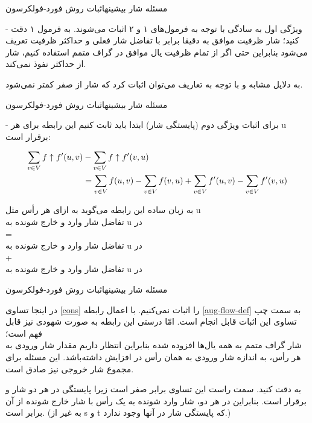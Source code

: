 \begin{itemframe}{مسئله شار بیشینه}{اثبات روش فورد-فولکرسون}
\item[-]
ویژگی اول به سادگی با توجه به فرمول‌های ۱ و ۲ اثبات می‌شوند. به فرمول ۱ دقت کنید‍؛ شار ظرفیت موافق به دقیقا برابر با تفاضل شار فعلی و حداکثر ظرفیت تعریف می‌شود بنابراین حتی اگر از تمام ظرفیت یال موافق در گراف متمم استفاده کنیم، شار
از حداکثر نفوذ نمی‌کند.
\item
به دلایل مشابه و با توجه به تعاریف می‌توان اثبات کرد که شار
از صفر کمتر نمی‌شود.
\end{itemframe}
\begin{itemframe}{مسئله شار بیشینه}{اثبات روش فورد-فولکرسون}
\item[-]
برای اثبات ویژگی دوم (پایستگی شار) ابتدا باید ثابت کنیم این رابطه برای هر u برقرار است:

\begin{align}
\sum_{v\in V} f \uparrow f'(u, v)  & - \sum_{v\in V} f \uparrow f'(v, u) \notag \\
&=
 \sum_{v\in V} f(u, v) - \sum_{v\in V} f (v, u)
+
\sum_{v\in V} f'(u, v) - \sum_{v\in V} f'(v, u)
\label{cons}
\end{align}
\item

به زبان ساده این رابطه می‌گوید به ازای هر رأس مثل u\\
تفاضل شار وارد و خارج شونده به u در
 \\
=\\
تفاضل شار وارد و خارج شونده به u در
 \\
+\\
تفاضل شار وارد و خارج شونده به u در
\\


\end{itemframe}
\begin{itemframe}{مسئله شار بیشینه}{اثبات روش فورد-فولکرسون}
\item
در اینجا تساوی \ref{cons} را اثبات نمی‌کنیم. با اعمال رابطه \ref{aug-flow-def} به سمت چپ تساوی این اثبات قابل انجام است. امّا درستی این رابطه به صورت شهودی نیز قابل فهم است؛
\\
شار گراف متمم به همه یال‌ها افزوده شده بنابراین انتظار داریم مقدار شار ورودی به هر رأس، به اندازه شار ورودی به همان رأس در
افزایش داشته‌باشد. این مسئله برای مجموع شار خروجی نیز صادق است.
\item
به
دقت کنید. سمت راست این تساوی برابر صفر است زیرا پایستگی در هر دو شار
و
برقرار است. بنابراین در هر دو، شار وارد شونده به یک رأس با شار خارج شونده از آن برابر است. (به غیر از s و t که پایستگی شار در آنها وجود ندارد.)
\end{itemframe}
